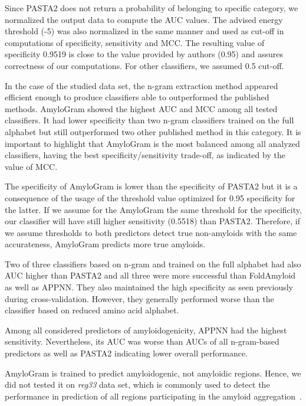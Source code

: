 \documentclass[a4,center,fleqn]{NAR}
\begin{document}
  Since PASTA2 does not return a probability of belonging to specific category, 
we normalized the output data to compute the AUC values. The advised 
energy threshold (-5) was also normalized in the same manner and used as 
cut-off in computations of specificity, sensitivity and MCC. The resulting 
value of specificity 0.9519 is close to the value provided by authors (0.95) and assures 
correctness of our computations. For other classifiers, we assumed 0.5 
cut-off.
    
  In the case of the studied data set, the n-gram extraction method appeared efficient enough to 
produce classifiers able to outperformed the published methods. AmyloGram showed the highest AUC and MCC among all tested classifiers. It had lower specificity than two n-gram classifiers trained on the full alphabet but still outperformed two other published method in this category. It is important to 
highlight that AmyloGram is the most balanced among all analyzed classifiers, 
having the best specificity/sensitivity trade-off, as indicated by the value of MCC.
 
  The specificity of AmyloGram is lower than the specificity of PASTA2 but it
is a consequence of the usage of the threshold value optimized for 0.95 
specificity for the latter. If we assume for the AmyloGram the same threshold for the specificity, our classifier will
have still higher sensitivity (0.5518) than PASTA2. Therefore, if we assume thresholds to both predictors detect true non-amyloids with the same accurateness, AmyloGram predicts more true amyloids. 

  Two of three classifiers based on n-gram and  trained on the full alphabet had also AUC higher than PASTA2 and all three were more successful than FoldAmyloid as well as APPNN. They also maintained  the high specificity as seen previously during cross-validation. However, they generally performed worse than the classifier based on reduced amino acid alphabet.

  Among all considered predictors of amyloidogenicity, APPNN had the highest 
sensitivity. Nevertheless, its AUC was worse than AUCs of all n-gram-based 
predictors as well as PASTA2 indicating lower overall performance.

  AmyloGram is trained to predict amyloidogenic, not amyloidic regions. Hence, we did not tested it on \textit{reg33} data set, which is commonly used to detect the performance in prediction of all regions participating in the amyloid aggregation~\citep{tsolis_consensus_2013}.
   
\end{document}
